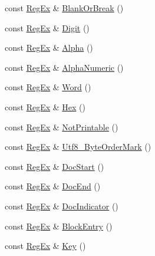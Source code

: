 \begin{DoxyCompactItemize}
\item 
const \mbox{\hyperlink{class_y_a_m_l_1_1_reg_ex}{Reg\+Ex}} \& \mbox{\hyperlink{namespace_y_a_m_l_1_1_exp_a5309dc4c7d913cc718b342101b111188}{Blank\+Or\+Break}} ()
\item 
const \mbox{\hyperlink{class_y_a_m_l_1_1_reg_ex}{Reg\+Ex}} \& \mbox{\hyperlink{namespace_y_a_m_l_1_1_exp_ac8a8777757e3233942106afdc651d57c}{Digit}} ()
\item 
const \mbox{\hyperlink{class_y_a_m_l_1_1_reg_ex}{Reg\+Ex}} \& \mbox{\hyperlink{namespace_y_a_m_l_1_1_exp_a860c40796895dd222b312d735bd61885}{Alpha}} ()
\item 
const \mbox{\hyperlink{class_y_a_m_l_1_1_reg_ex}{Reg\+Ex}} \& \mbox{\hyperlink{namespace_y_a_m_l_1_1_exp_a715a4903783c809c0baec851534355a7}{Alpha\+Numeric}} ()
\item 
const \mbox{\hyperlink{class_y_a_m_l_1_1_reg_ex}{Reg\+Ex}} \& \mbox{\hyperlink{namespace_y_a_m_l_1_1_exp_af1b8edcfdbd528cef70b14f21c5e2ec6}{Word}} ()
\item 
const \mbox{\hyperlink{class_y_a_m_l_1_1_reg_ex}{Reg\+Ex}} \& \mbox{\hyperlink{namespace_y_a_m_l_1_1_exp_adce10005c20c3202cfea2121eb582968}{Hex}} ()
\item 
const \mbox{\hyperlink{class_y_a_m_l_1_1_reg_ex}{Reg\+Ex}} \& \mbox{\hyperlink{namespace_y_a_m_l_1_1_exp_a0888fe94e77d16b4ba8be356e9fbb102}{Not\+Printable}} ()
\item 
const \mbox{\hyperlink{class_y_a_m_l_1_1_reg_ex}{Reg\+Ex}} \& \mbox{\hyperlink{namespace_y_a_m_l_1_1_exp_adc1bd1e09065b9c19a0307131e2059bb}{Utf8\+\_\+\+Byte\+Order\+Mark}} ()
\item 
const \mbox{\hyperlink{class_y_a_m_l_1_1_reg_ex}{Reg\+Ex}} \& \mbox{\hyperlink{namespace_y_a_m_l_1_1_exp_a1c6c45e1b69708b90a543ed63f65c375}{Doc\+Start}} ()
\item 
const \mbox{\hyperlink{class_y_a_m_l_1_1_reg_ex}{Reg\+Ex}} \& \mbox{\hyperlink{namespace_y_a_m_l_1_1_exp_a546014afae6b876d82a3d9796cea487c}{Doc\+End}} ()
\item 
const \mbox{\hyperlink{class_y_a_m_l_1_1_reg_ex}{Reg\+Ex}} \& \mbox{\hyperlink{namespace_y_a_m_l_1_1_exp_a1e28f9da39a4eece5e251bbdfce48674}{Doc\+Indicator}} ()
\item 
const \mbox{\hyperlink{class_y_a_m_l_1_1_reg_ex}{Reg\+Ex}} \& \mbox{\hyperlink{namespace_y_a_m_l_1_1_exp_a1f085ebf9844901e366a254366dc19b2}{Block\+Entry}} ()
\item 
const \mbox{\hyperlink{class_y_a_m_l_1_1_reg_ex}{Reg\+Ex}} \& \mbox{\hyperlink{namespace_y_a_m_l_1_1_exp_ab4c7653c038cb3a6aaba7806dec035a8}{Key}} ()

\end{DoxyCompactItemize}
